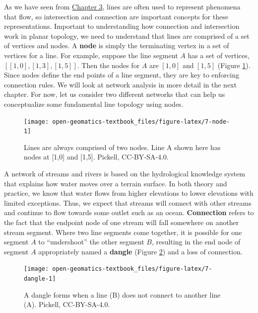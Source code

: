 \documentclass[
]{book}
\begin{document}
As we have seen from \href{https://ubc-geomatics-textbook.github.io/geomatics-textbook/types-of-data.html}{Chapter 3}, lines are often used to represent phenomena that flow, so intersection and connection are important concepts for these representations. Important to understanding how connection and intersection work in planar topology, we need to understand that lines are comprised of a set of vertices and nodes. A \textbf{node} is simply the terminating vertex in a set of vertices for a line. For example, suppose the line segment \(A\) has a set of vertices, \([[1,0],[1,3],[1,5]]\). Then the nodes for \(A\) are \([1,0]\) and \([1,5]\) (Figure \ref{fig:7-node}). Since nodes define the end points of a line segment, they are key to enforcing connection rules. We will look at network analysis in more detail in the next chapter. For now, let us consider two different networks that can help us conceptualize some fundamental line topology using nodes.

\begin{figure}

{\centering \texttt{[image: open-geomatics-textbook\_files/figure-latex/7-node-1]} 

}

\caption{Lines are always comprised of two nodes. Line A shown here has nodes at [1,0] and [1,5]. Pickell, CC-BY-SA-4.0.}\label{fig:7-node}
\end{figure}

A network of streams and rivers is based on the hydrological knowledge system that explains how water moves over a terrain surface. In both theory and practice, we know that water flows from higher elevations to lower elevations with limited exceptions. Thus, we expect that streams will connect with other streams and continue to flow towards some outlet such as an ocean. \textbf{Connection} refers to the fact that the endpoint node of one stream will fall somewhere on another stream segment. Where two line segments come together, it is possible for one segment \(A\) to ``undershoot'' the other segment \(B\), resulting in the end node of segment \(A\) appropriately named a \textbf{dangle} (Figure \ref{fig:7-dangle}) and a loss of connection.

\begin{figure}

{\centering \texttt{[image: open-geomatics-textbook\_files/figure-latex/7-dangle-1]} 

}

\caption{A dangle forms when a line (B) does not connect to another line (A). Pickell, CC-BY-SA-4.0.}\label{fig:7-dangle}
\end{figure}
\end{document}
